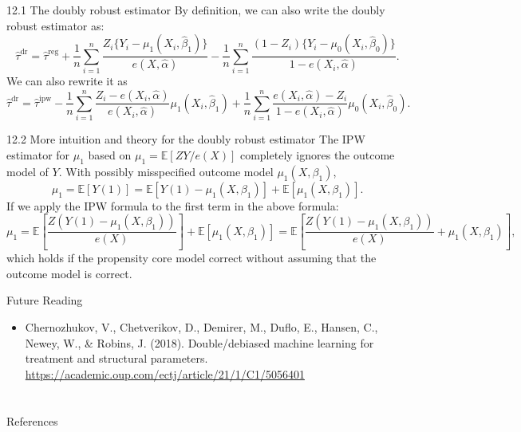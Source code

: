 \documentclass[aspectratio=169, 12pt]{beamer}
\newcommand{\E}{\mathbb{E}}
\begin{document}
\begin{frame}{12.1 The doubly robust estimator}
  By definition, we can also write the doubly robust estimator as:
  \[
  \hat{\tau}^{\text{dr}} = \hat{\tau}^{\text{reg}} + \frac{1}{n}\sum_{i=1}^{n}\frac{Z_i\{Y_i-\mu_1(X_i,\hat{\beta}_1)\}}{e(X,\hat{\alpha})} - \frac{1}{n}\sum_{i=1}^{n}\frac{(1-Z_i)\{Y_i-\mu_0(X_i,\hat{\beta}_0)\}}{1-e(X_i,\hat{\alpha})}.
  \]
  We can also rewrite it as
  \[
  \hat{\tau}^{\text{dr}} = \hat{\tau}^{\text{ipw}} - \frac{1}{n}\sum_{i=1}^{n}\frac{Z_i-e(X_i,\hat{\alpha})}{e(X_i,\hat{\alpha})}\mu_1(X_i,\hat{\beta}_1) + \frac{1}{n}\sum_{i=1}^{n}\frac{e(X_i,\hat{\alpha})-Z_i}{1-e(X_i,\hat{\alpha})}\mu_0(X_i,\hat{\beta}_0).
  \]
\end{frame}

\begin{frame}{12.2 More intuition and theory for the doubly robust estimator}
  The IPW estimator for $\mu_1$ based on $\mu_1 = \E\left[ZY/e(X)\right]$ completely ignores the outcome model of $Y$. With possibly misspecified outcome model $\mu_1(X,\beta_1)$,
  \[
  \mu_1 =\E[Y(1)] = \E[Y(1)-\mu_1(X,\beta_1)] + \E[\mu_1(X,\beta_1)].
  \]
  If we apply the IPW formula to the first term in the above formula:
  \[
  \mu_1= \E\left[\frac{Z(Y(1)-\mu_1(X,\beta_1))}{e(X)}\right] + \E[\mu_1(X,\beta_1)] = \E\left[\frac{Z(Y(1)-\mu_1(X,\beta_1))}{e(X)}+\mu_1(X,\beta_1)\right],
  \]
  which holds if the propensity core model correct without assuming that the outcome model is correct. 
\end{frame}

\begin{frame}{Future Reading}
  \begin{itemize}
    \item Chernozhukov, V., Chetverikov, D., Demirer, M., Duflo, E., Hansen, C., Newey, W., \& Robins, J. (2018). Double/debiased machine learning for treatment and structural parameters. \url{https://academic.oup.com/ectj/article/21/1/C1/5056401}
  \end{itemize}
\end{frame}


\section{}
\begin{frame}{References}
  \beamerdefaultoverlayspecification{}
  \small
  
\end{frame}
\end{document}
